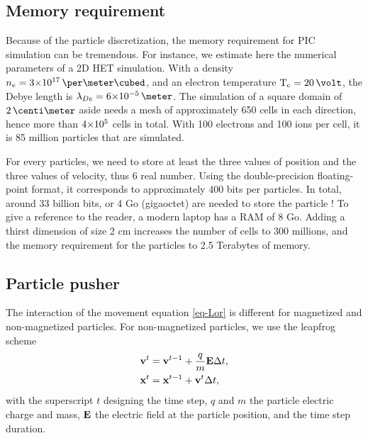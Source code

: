     \subsection{Memory requirement}
    Because of the particle discretization, the memory requirement for \ac{PIC} simulation can be tremendous.
    For instance, we estimate here the numerical parameters of a \ac{2D} \ac{HET} simulation.
    With a density $n_e = \sn{3}{17}\,\per\meter\cubed$, and an electron temperature $\Te=20\,\volt$, the Debye length is $\lde=\sn{6}{-5}\,\meter$.
    The simulation of a square domain of $2\,\centi\meter$ aside needs a mesh of approximately 650 cells in each direction, hence more than ${{4}{\times}10^{5}}$ cells in total.
    With 100 electrons and 100 ions per cell, it is 85 million particles that are simulated.
    
    For every particles, we need to store at least the three values of position and the three values of velocity, thus 6 real number.
    Using the double-precision floating-point format, it corresponds to approximately 400 bits per particles.
    In total, around 33 billion bits, or 4 Go (gigaoctet) are needed to store the particle ! 
    To give a reference to the reader, a modern laptop has a RAM of 8 Go.
    Adding a thirst dimension of size 2 cm increases the number of cells to 300 millions, and the memory requirement for the particles to 2.5 Terabytes of memory.
    
    
    \subsection{Particle pusher}
    The interaction of the movement equation \cref{eq-Lor} is different for magnetized and non-magnetized particles.
    For non-magnetized particles, we use the leapfrog scheme \cite{birdsall1991}
    \begin{align}\label{eq-leapfrog}
      {\mathbf v}^t &= {\mathbf v}^{t-1} + \frac{q}{m} {\mathbf E} \Delta t, \\
      {\mathbf x}^t &= {\mathbf x}^{t-1} + {\mathbf v}^t \Delta t,
    \end{align}
    with the superscript $t$ designing the time step, $q$ and $m$ the particle electric charge and mass, ${\mathbf E}$ the electric field at the particle position, and \dt the time step duration.

